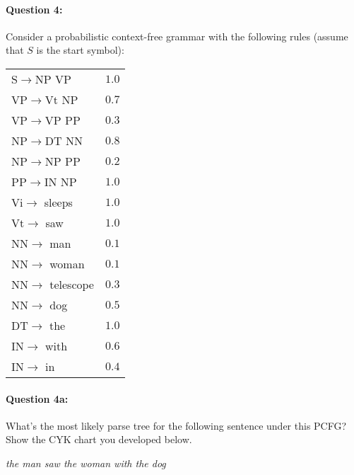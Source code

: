 \documentclass[10pt]{article}
\begin{document}
\paragraph{Question 4:} Consider a probabilistic context-free grammar with the following rules (assume that $S$ is the start symbol):
\begin{table}[H]
  \centering
  \begin{tabular}{|ll|}
    \hline
    $\mathrm{S} \rightarrow \mathrm{NP}$ $\mathrm{VP}$  & $1.0$ \\
    $\mathrm{VP} \rightarrow \mathrm{Vt}$ $\mathrm{NP}$ & $0.7$ \\
    $\mathrm{VP} \rightarrow \mathrm{VP}$ $\mathrm{PP}$ & $0.3$ \\
    $\mathrm{NP} \rightarrow \mathrm{DT}$ $\mathrm{NN}$ & $0.8$ \\
    $\mathrm{NP} \rightarrow \mathrm{NP}$ $\mathrm{PP}$ & $0.2$ \\
    $\mathrm{PP} \rightarrow \mathrm{IN}$ $\mathrm{NP}$ & $1.0$ \\
    \hline
    $\mathrm{Vi} \rightarrow$ sleeps                    & $1.0$ \\
    $\mathrm{Vt} \rightarrow$ saw                       & $1.0$ \\
    $\mathrm{NN} \rightarrow$ man                       & $0.1$ \\
    $\mathrm{NN} \rightarrow$ woman                     & $0.1$ \\
    $\mathrm{NN} \rightarrow$ telescope                 & $0.3$ \\
    $\mathrm{NN} \rightarrow$ dog                       & $0.5$ \\
    $\mathrm{DT} \rightarrow$ the                       & $1.0$ \\
    $\mathrm{IN} \rightarrow$ with                      & $0.6$ \\
    $\mathrm{IN} \rightarrow$ in                        & $0.4$ \\
    \hline
  \end{tabular}
\end{table}


\paragraph{Question 4a:} What's the most likely parse tree for the following sentence under this PCFG? Show the CYK chart you developed below.

\textit{the man saw the woman with the dog}
\end{document}
